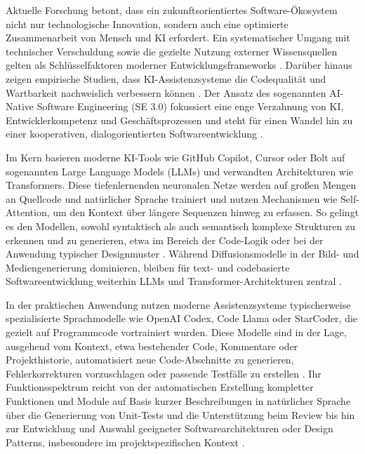 
\label{sec:wichtige-algorithmen-modelle}

Aktuelle Forschung betont, dass ein zukunftsorientiertes Software-Ökosystem
nicht nur technologische Innovation, sondern auch eine optimierte
Zusammenarbeit von Mensch und KI erfordert. Ein systematischer Umgang mit
technischer Verschuldung sowie die gezielte Nutzung externer Wissensquellen
gelten als Schlüsselfaktoren moderner Entwicklungsframeworks
\cite{matsumoto_conceptual_2021}. Darüber hinaus zeigen empirische Studien,
dass KI-Assistenzsysteme die Codequalität und Wartbarkeit nachweislich
verbessern können \cite{martinovic_impact_2024}. Der Ansatz des sogenannten
\glqq AI-Native Software Engineering\grqq{} (SE 3.0) fokussiert eine enge
Verzahnung von KI, Entwicklerkompetenz und Geschäftsprozessen und steht für
einen Wandel hin zu einer kooperativen, dialogorientierten Softwareentwicklung
\cite{hassan_towards_2024}.

Im Kern basieren moderne KI-Tools wie GitHub Copilot, Cursor oder Bolt auf
sogenannten Large Language Models (LLMs) und verwandten Architekturen wie
Transformers. Diese tiefenlernenden neuronalen Netze werden auf großen Mengen
an Quellcode und natürlicher Sprache trainiert und nutzen Mechanismen wie
Self-Attention, um den Kontext über längere Sequenzen hinweg zu erfassen. So
gelingt es den Modellen, sowohl syntaktisch als auch semantisch komplexe
Strukturen zu erkennen und zu generieren, etwa im Bereich der Code-Logik oder
bei der Anwendung typischer Designmuster \cite{nguyen-duc_generative_2023,
    esposito_generative_2025}. Während Diffusionsmodelle in der Bild- und
Mediengenerierung dominieren, bleiben für text- und codebasierte
Softwareentwicklung weiterhin LLMs und Transformer-Architekturen zentral
\cite{weisz_design_2024}.

In der praktischen Anwendung nutzen moderne Assistenzsysteme typischerweise
spezialisierte Sprachmodelle wie OpenAI Codex, Code Llama oder StarCoder, die
gezielt auf Programmcode vortrainiert wurden. Diese Modelle sind in der Lage,
ausgehend vom Kontext, etwa bestehender Code, Kommentare oder Projekthistorie,
automatisiert neue Code-Abschnitte zu generieren, Fehlerkorrekturen
vorzuschlagen oder passende Testfälle zu erstellen \cite{coutinho_role_2024,
    esposito_generative_2025}. Ihr Funktionsspektrum reicht von der automatischen
Erstellung kompletter Funktionen und Module auf Basis kurzer Beschreibungen in
natürlicher Sprache über die Generierung von Unit-Tests und die Unterstützung
beim Review bis hin zur Entwicklung und Auswahl geeigneter
Softwarearchitekturen oder Design Patterns, insbesondere im projektspezifischen
Kontext \cite{coutinho_role_2024, esposito_generative_2025, donvir_role_2024}.


